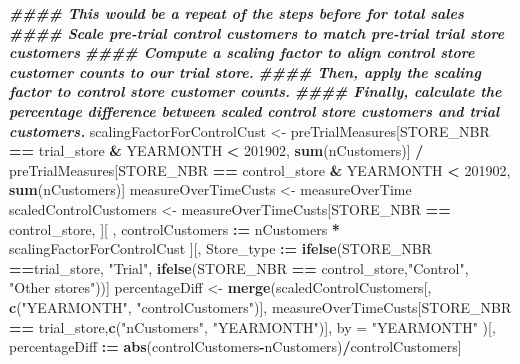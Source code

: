 \documentclass[
]{article}
\newenvironment{Shaded}{\begin{snugshade}}{\end{snugshade}}
\newcommand{\AttributeTok}[1]{\textcolor[rgb]{0.13,0.29,0.53}{#1}}
\newcommand{\DecValTok}[1]{\textcolor[rgb]{0.00,0.00,0.81}{#1}}
\newcommand{\DocumentationTok}[1]{\textcolor[rgb]{0.56,0.35,0.01}{\textbf{\textit{#1}}}}
\newcommand{\FunctionTok}[1]{\textcolor[rgb]{0.13,0.29,0.53}{\textbf{#1}}}
\newcommand{\NormalTok}[1]{#1}
\newcommand{\OtherTok}[1]{\textcolor[rgb]{0.56,0.35,0.01}{#1}}
\newcommand{\SpecialCharTok}[1]{\textcolor[rgb]{0.81,0.36,0.00}{\textbf{#1}}}
\newcommand{\StringTok}[1]{\textcolor[rgb]{0.31,0.60,0.02}{#1}}
\begin{document}
\begin{Shaded}
\begin{Highlighting}[]
\DocumentationTok{\#\#\#\# This would be a repeat of the steps before for total sales}
\DocumentationTok{\#\#\#\# Scale pre{-}trial control customers to match pre{-}trial trial store customers}
\DocumentationTok{\#\#\#\# Compute a scaling factor to align control store customer counts to our trial store.}
\DocumentationTok{\#\#\#\# Then, apply the scaling factor to control store customer counts.}
\DocumentationTok{\#\#\#\# Finally, calculate the percentage difference between scaled control store customers and trial customers.}
\NormalTok{scalingFactorForControlCust }\OtherTok{\textless{}{-}}\NormalTok{ preTrialMeasures[STORE\_NBR }\SpecialCharTok{==}\NormalTok{ trial\_store }\SpecialCharTok{\&}
\NormalTok{YEARMONTH }\SpecialCharTok{\textless{}} \DecValTok{201902}\NormalTok{, }\FunctionTok{sum}\NormalTok{(nCustomers)] }\SpecialCharTok{/}\NormalTok{ preTrialMeasures[STORE\_NBR }\SpecialCharTok{==}
\NormalTok{control\_store }\SpecialCharTok{\&}\NormalTok{ YEARMONTH }\SpecialCharTok{\textless{}} \DecValTok{201902}\NormalTok{, }\FunctionTok{sum}\NormalTok{(nCustomers)]}
\NormalTok{measureOverTimeCusts }\OtherTok{\textless{}{-}}\NormalTok{ measureOverTime}
\NormalTok{scaledControlCustomers }\OtherTok{\textless{}{-}}\NormalTok{ measureOverTimeCusts[STORE\_NBR }\SpecialCharTok{==}\NormalTok{ control\_store,}
\NormalTok{][ , controlCustomers }\SpecialCharTok{:=}\NormalTok{ nCustomers }\SpecialCharTok{*}\NormalTok{ scalingFactorForControlCust}
\NormalTok{][, Store\_type }\SpecialCharTok{:=} \FunctionTok{ifelse}\NormalTok{(STORE\_NBR }\SpecialCharTok{==}\NormalTok{trial\_store, }\StringTok{"Trial"}\NormalTok{,}
\FunctionTok{ifelse}\NormalTok{(STORE\_NBR }\SpecialCharTok{==}\NormalTok{ control\_store,}\StringTok{"Control"}\NormalTok{, }\StringTok{"Other stores"}\NormalTok{))]}
\NormalTok{percentageDiff }\OtherTok{\textless{}{-}} \FunctionTok{merge}\NormalTok{(scaledControlCustomers[, }\FunctionTok{c}\NormalTok{(}\StringTok{"YEARMONTH"}\NormalTok{, }\StringTok{"controlCustomers"}\NormalTok{)],}
\NormalTok{measureOverTimeCusts[STORE\_NBR }\SpecialCharTok{==}\NormalTok{ trial\_store,}\FunctionTok{c}\NormalTok{(}\StringTok{"nCustomers"}\NormalTok{, }\StringTok{"YEARMONTH"}\NormalTok{)],}
\AttributeTok{by =} \StringTok{"YEARMONTH"}
\NormalTok{)[, percentageDiff }\SpecialCharTok{:=} \FunctionTok{abs}\NormalTok{(controlCustomers}\SpecialCharTok{{-}}\NormalTok{nCustomers)}\SpecialCharTok{/}\NormalTok{controlCustomers]}
\end{Highlighting}
\end{Shaded}
\end{document}
